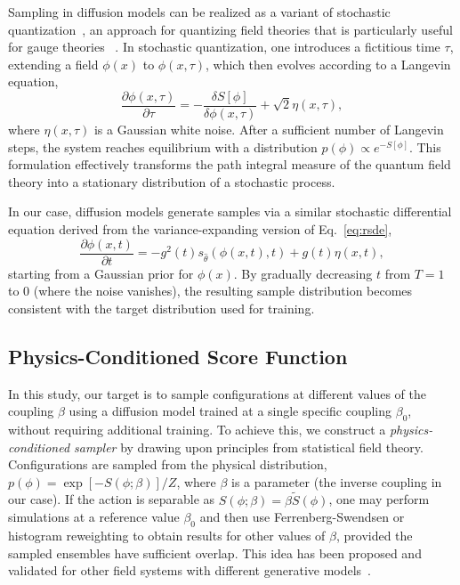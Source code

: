 \documentclass[a4paper,11pt]{article}
\begin{document}
Sampling in diffusion models can be realized \cite{Wang:2023exq} as a variant of stochastic quantization~\cite{Parisi:1980ys}, an approach for quantizing field theories that is particularly useful for gauge theories ~\cite{Damgaard:1987rr,Namiki:1993fd}. In stochastic quantization, one introduces a fictitious time $\tau$, extending a field $\phi(x)$ to $\phi(x,\tau)$, which then evolves according to a Langevin equation,
\begin{equation} 
\frac{\partial \phi(x, \tau)}{\partial \tau} = -\frac{\delta S[\phi]}{\delta \phi(x,\tau)} + \sqrt{2}\eta(x,\tau), \label{eq:tl}
\end{equation}
where $\eta(x,\tau)$ is a Gaussian white noise. After a sufficient number of Langevin steps, the system reaches equilibrium with a distribution $p(\phi) \propto e^{-S[\phi]}$. This formulation effectively transforms the path integral measure of the quantum field theory into a stationary distribution of a stochastic process.

In our case, diffusion models generate samples via a similar stochastic differential equation derived from the variance-expanding version of Eq.~\eqref{eq:rsde},
\begin{equation} 
\frac{\partial \phi(x, t)}{\partial t} = -g^2(t) s_{\hat{\theta}}(\phi(x,t),t) + g(t)\eta(x, t), 
\end{equation} 
starting from a Gaussian prior for $\phi(x)$. By gradually decreasing $t$ from $T=1$ to 0 (where the noise vanishes), the resulting sample distribution becomes consistent with the target distribution used for training.

\subsection{Physics-Conditioned Score Function}

In this study, our target is to sample configurations at different values of the coupling $\beta$ using a diffusion model trained at a single specific coupling $\beta_0$, without requiring additional training. To achieve this, we construct a \textit{physics-conditioned sampler} by drawing upon principles from statistical field theory. Configurations are sampled from the physical distribution,
$p(\phi) = \exp[-S(\phi;\beta)]/Z$, where $\beta$ is a parameter (the inverse coupling in our case). If the action is separable as $S(\phi;\beta) = \beta \tilde{S}(\phi)$, one may perform simulations at a reference value $\beta_0$ and then use Ferrenberg-Swendsen or histogram reweighting \cite{PhysRevLett.61.2635} to obtain results for other values of $\beta$, provided the sampled ensembles have sufficient overlap. This idea has been proposed and validated for other field systems with different generative models~\cite{Wang:2020nnsm,Xu:2024tjp}.
\end{document}
